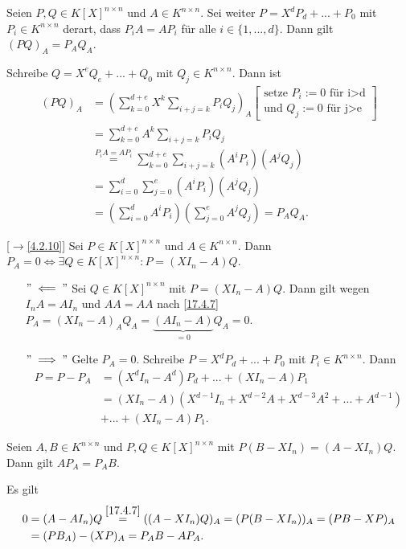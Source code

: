 \documentclass[../../main.tex]{subfiles}
\begin{document}
\begin{lem}\label{17.4.7}
Seien $P,Q\in K[X]^{n\times n}$ und $A\in K^{n\times n}$. Sei weiter $P=X^dP_d+...+P_0$ mit $P_i\in K^{n\times n}$ derart, dass $P_iA=AP_i$ für alle $i\in\{1,...,d\}$. Dann gilt $(PQ)_A=P_AQ_A$.
\end{lem}
\begin{cproof}
Schreibe $Q=X^eQ_e+...+Q_0$ mit $Q_j\in K^{n\times n}$. Dann ist
\begin{align*}
(PQ)_A&=\left(\sum_{k=0}^{d+e}X^k\sum_{i+j=k}P_iQ_j\right)_A\left[\begin{matrix}\text{setze }P_i:=0\text{ für i>d}\\\text{und }Q_j:=0\text{ für j>e}\end{matrix}\right]\\
&=\sum_{k=0}^{d+e}A^k\sum_{i+j=k}P_iQ_j\\
&\stackrel{P_iA=AP_i}{=}\sum_{k=0}^{d+e}\sum_{i+j=k}(A^iP_i)(A^jQ_j)\\
&=\sum_{i=0}^d\sum_{j=0}^e(A^i P_i)(A^j Q_j)\\
&=\left(\sum_{i=0}^d A^iP_i\right)\left(\sum_{j=0}^e A^jQ_j\right)=P_AQ_A.
\end{align*}
\end{cproof}

\begin{lem}\mbox{}[$\to$\ref{4.2.10}]
\label{17.4.8}
Sei $P\in K[X]^{n\times n}$ und $A\in K^{n\times n}$. Dann $P_A=0\Longleftrightarrow \exists Q\in K[X]^{n\times n}: P=(XI_n-A)Q$.
\end{lem}
\begin{cproof}
\begin{itemize}
\item[$"\impliedby"$] Sei $Q\in K[X]^{n\times n}$ mit $P=(XI_n-A)Q$. Dann gilt wegen $I_nA=AI_n$  und $AA=AA$ nach \ref{17.4.7} $P_A=(XI_n-A)_AQ_A=\underbrace{(AI_n-A)}_{=0}Q_A=0$.
\item[$"\implies"$] Gelte $P_A=0$. Schreibe $P=X^dP_d+...+P_0$ mit $P_i\in K^{n\times n}$. Dann
\begin{align*}
P=P-P_A&=(X^dI_n-A^d)P_d+...+(XI_n-A)P_1\\
&=(XI_n-A)(X^{d-1}I_n+X^{d-2}A+X^{d-3}A^2+...+A^{d-1})\\
&+...+(XI_n-A)P_1.
\end{align*}
\end{itemize}
\end{cproof}

\begin{lem}\label{17.4.9}
Seien $A,B\in K^{n\times n}$ und $P,Q\in K[X]^{n\times n}$ mit $P(B-XI_n)=(A-XI_n)Q$. Dann gilt $AP_A=P_AB$.
\end{lem}
\begin{cproof}
Es gilt
\begin{align*}
0&=(A-AI_n)Q\stackrel{\ref{17.4.7}}{=}((A-XI_n)Q)_A=(P(B-XI_n))_A=(PB-XP)_A\\
&=(PB_A)-(XP)_A=P_AB-AP_A.
\end{align*}
\end{cproof}
\end{document}
